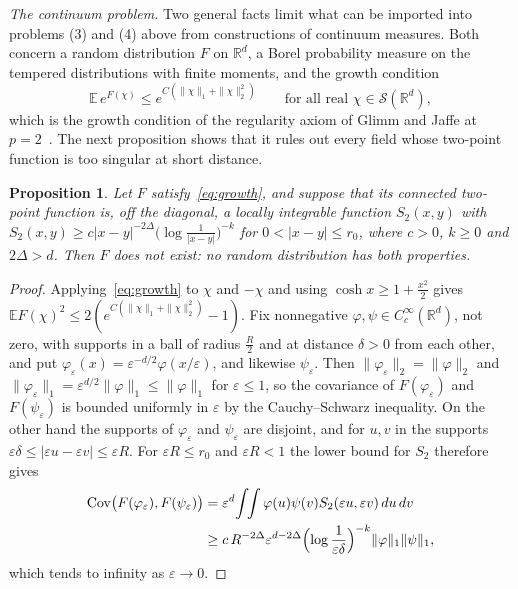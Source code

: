\documentclass[11pt]{amsart}
\newtheorem{proposition}[theorem]{Proposition}
\theoremstyle{definition}
\theoremstyle{remark}
\numberwithin{equation}{section}
\newcommand{\R}{\mathbb{R}}
\newcommand{\E}{\mathbb{E}}
\newcommand{\Cov}{\operatorname{Cov}}
\begin{document}
\emph{The continuum problem.} Two general facts limit what can be imported
into problems (3) and (4) above from constructions of continuum measures.
Both concern a random distribution $F$ on $\R^d$, a Borel probability
measure on the tempered distributions with finite moments, and the growth
condition
\begin{equation}\label{eq:growth}
\E\,e^{F(\chi)}\le e^{C(\|\chi\|_1+\|\chi\|_2^2)}\qquad\text{for all real }
\chi\in\mathcal S(\R^d),
\end{equation}
which is the growth condition of the regularity axiom of Glimm and Jaffe at
$p=2$~\cite[Sect.~6.1, (6.1.5)]{GJ87}. The next proposition shows that it
rules out every field whose two-point function is too singular at short
distance.

\begin{proposition}\label{prop:growth}
Let $F$ satisfy~\eqref{eq:growth}, and suppose that its connected two-point
function is, off the diagonal, a locally integrable function $S_2(x,y)$
with $S_2(x,y)\ge c|x-y|^{-2\Delta}\bigl(\log\frac1{|x-y|}\bigr)^{-k}$ for
$0<|x-y|\le r_0$, where $c>0$, $k\ge0$ and $2\Delta>d$. Then $F$ does not
exist: no random distribution has both properties.
\end{proposition}

\begin{proof}
Applying~\eqref{eq:growth} to $\chi$ and $-\chi$ and using $\cosh x\ge1+\frac{x^2}2$
gives $\E F(\chi)^2\le2(e^{C(\|\chi\|_1+\|\chi\|_2^2)}-1)$. Fix nonnegative
$\varphi,\psi\in C_c^\infty(\R^d)$, not zero, with supports in a ball of
radius $\frac R2$ and at distance $\delta>0$ from each other, and put
$\varphi_\varepsilon(x)=\varepsilon^{-d/2}\varphi(x/\varepsilon)$, and likewise
$\psi_\varepsilon$. Then $\|\varphi_\varepsilon\|_2=\|\varphi\|_2$ and
$\|\varphi_\varepsilon\|_1=\varepsilon^{d/2}\|\varphi\|_1\le\|\varphi\|_1$ for
$\varepsilon\le1$, so the covariance of $F(\varphi_\varepsilon)$ and
$F(\psi_\varepsilon)$ is bounded uniformly in $\varepsilon$ by the
Cauchy--Schwarz inequality. On the other hand the supports of
$\varphi_\varepsilon$ and $\psi_\varepsilon$ are disjoint, and for $u,v$ in the
supports $\varepsilon\delta\le|\varepsilon u-\varepsilon v|\le\varepsilon R$.
For $\varepsilon R\le r_0$ and $\varepsilon R<1$ the lower bound for $S_2$
therefore gives
\[
\begin{split}
\Cov\bigl(F(\varphi_\varepsilon),F(\psi_\varepsilon)\bigr)&=\varepsilon^d\!\int\!\!\int
\varphi(u)\psi(v)S_2(\varepsilon u,\varepsilon v)\,du\,dv\\
&\ge c\,R^{-2\Delta}\varepsilon^{d-2\Delta}\Bigl(\log\frac1{\varepsilon\delta}\Bigr)^{-k}
\|\varphi\|_1\|\psi\|_1 ,
\end{split}
\]
which tends to infinity as $\varepsilon\to0$.
\end{proof}
\end{document}
